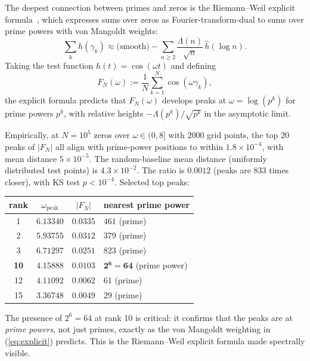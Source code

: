 \documentclass[11pt,a4paper]{article}
\theoremstyle{plain}
\theoremstyle{definition}
\theoremstyle{remark}
\begin{document}
The deepest connection between primes and zeros is the Riemann--Weil
explicit formula~\cite{Weil1952}, which expresses sums over zeros as
Fourier-transform-dual to sums over prime powers with von Mangoldt weights:
\begin{equation}
  \sum_k h(\gamma_k) \approx \text{(smooth)} - \sum_{n \geq 2}
  \frac{\Lambda(n)}{\sqrt{n}}\, \hat{h}(\log n).
  \label{eq:explicit}
\end{equation}
Taking the test function $h(t) = \cos(\omega t)$ and defining
\begin{equation}
  F_N(\omega) := \frac{1}{N} \sum_{k=1}^{N} \cos(\omega \gamma_k),
  \label{eq:F-omega}
\end{equation}
the explicit formula predicts that $F_N(\omega)$ develops peaks at
$\omega = \log(p^k)$ for prime powers $p^k$, with relative heights
$-\Lambda(p^k)/\sqrt{p^k}$ in the asymptotic limit.

Empirically, at $N = 10^5$ zeros over $\omega \in (0, 8]$ with
$2000$ grid points, the top $20$ peaks of $|F_N|$ all align with
prime-power positions to within $1.8 \times 10^{-4}$, with mean
distance $5 \times 10^{-5}$. The random-baseline mean distance
(uniformly distributed test points) is $4.3 \times 10^{-2}$.
The ratio is $0.0012$ (peaks are 833 times closer), with KS test
$p < 10^{-4}$. Selected top peaks:

\begin{center}
\begin{tabular}{cccl}
\toprule
rank & $\omega_{\text{peak}}$ & $|F_N|$ & nearest prime power \\
\midrule
1 & $6.13340$ & $0.0335$ & $461$ (prime) \\
2 & $5.93755$ & $0.0312$ & $379$ (prime) \\
3 & $6.71297$ & $0.0251$ & $823$ (prime) \\
\textbf{10} & $\mathbf{4.15888}$ & $\mathbf{0.0103}$ & $\mathbf{2^6 = 64}$ (prime power) \\
12 & $4.11092$ & $0.0062$ & $61$ (prime) \\
15 & $3.36748$ & $0.0049$ & $29$ (prime) \\
\bottomrule
\end{tabular}
\end{center}

The presence of $2^6 = 64$ at rank 10 is critical: it confirms that
the peaks are at \emph{prime powers}, not just primes, exactly as the
von Mangoldt weighting in (\ref{eq:explicit}) predicts. This is the
Riemann--Weil explicit formula made spectrally visible.
\end{document}
